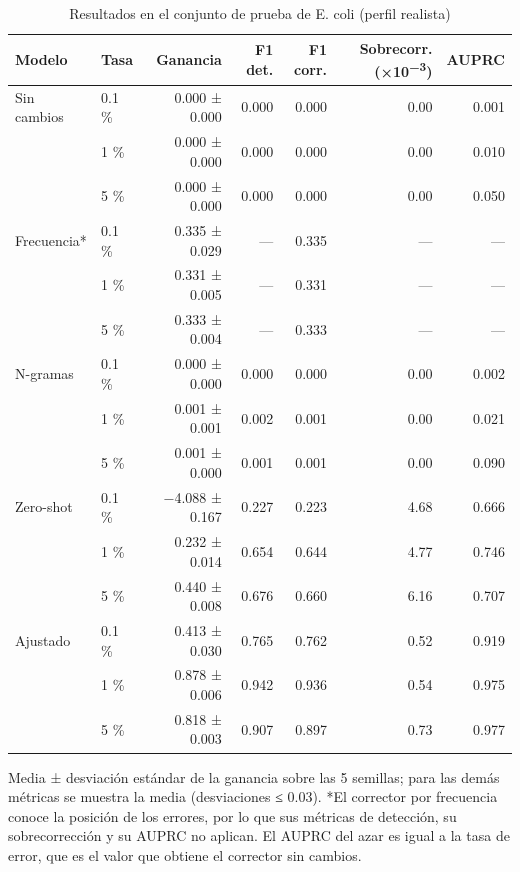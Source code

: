 \documentclass[sigconf,nonacm]{acmart}
\begin{document}
\begin{table}[t]
\caption{Resultados en el conjunto de prueba de E. coli (perfil realista)}
\label{tab:prueba}
\small
\begin{tabular}{llrrrrr}
\toprule
\textbf{Modelo} & \textbf{Tasa} & \textbf{Ganancia} & \textbf{F1 det.} & \textbf{F1 corr.} & \textbf{Sobrecorr. (×10\textsuperscript{−3})} & \textbf{AUPRC} \\
\midrule
Sin cambios & 0.1 \% & 0.000 ± 0.000 & 0.000 & 0.000 & 0.00 & 0.001 \\
 & 1 \% & 0.000 ± 0.000 & 0.000 & 0.000 & 0.00 & 0.010 \\
 & 5 \% & 0.000 ± 0.000 & 0.000 & 0.000 & 0.00 & 0.050 \\
\midrule
Frecuencia* & 0.1 \% & 0.335 ± 0.029 & --- & 0.335 & --- & --- \\
 & 1 \% & 0.331 ± 0.005 & --- & 0.331 & --- & --- \\
 & 5 \% & 0.333 ± 0.004 & --- & 0.333 & --- & --- \\
\midrule
N-gramas & 0.1 \% & 0.000 ± 0.000 & 0.000 & 0.000 & 0.00 & 0.002 \\
 & 1 \% & 0.001 ± 0.001 & 0.002 & 0.001 & 0.00 & 0.021 \\
 & 5 \% & 0.001 ± 0.000 & 0.001 & 0.001 & 0.00 & 0.090 \\
\midrule
Zero-shot & 0.1 \% & −4.088 ± 0.167 & 0.227 & 0.223 & 4.68 & 0.666 \\
 & 1 \% & 0.232 ± 0.014 & 0.654 & 0.644 & 4.77 & 0.746 \\
 & 5 \% & 0.440 ± 0.008 & 0.676 & 0.660 & 6.16 & 0.707 \\
\midrule
Ajustado & 0.1 \% & 0.413 ± 0.030 & 0.765 & 0.762 & 0.52 & 0.919 \\
 & 1 \% & 0.878 ± 0.006 & 0.942 & 0.936 & 0.54 & 0.975 \\
 & 5 \% & 0.818 ± 0.003 & 0.907 & 0.897 & 0.73 & 0.977 \\
\bottomrule
\end{tabular}

\vspace{2pt}\begin{minipage}{\textwidth}\footnotesize Media ± desviación estándar de la ganancia sobre las 5 semillas; para las demás métricas se muestra la media (desviaciones ≤ 0.03). *El corrector por frecuencia conoce la posición de los errores, por lo que sus métricas de detección, su sobrecorrección y su AUPRC no aplican. El AUPRC del azar es igual a la tasa de error, que es el valor que obtiene el corrector sin cambios.\end{minipage}
\end{table}
\end{document}
